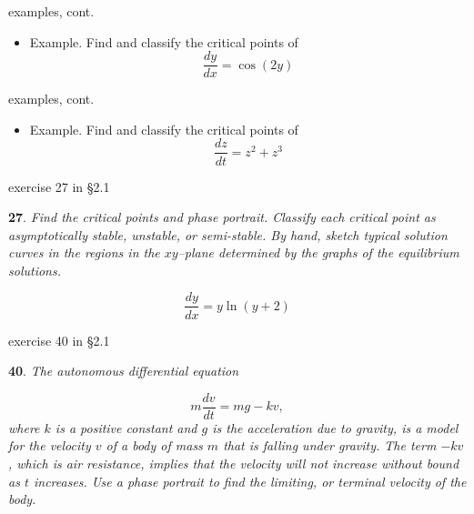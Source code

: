 \documentclass{beamer}
\begin{document}
\begin{frame}{examples, cont.}

\small
\begin{minipage}[t]{0.5\textwidth}
\begin{itemize}
\item Example. Find and classify the critical points of
   $$\frac{dy}{dx} = \cos(2y)$$

\vspace{40mm}
\end{itemize}
\end{minipage}
\end{frame}


\begin{frame}{examples, cont.}

\small
\begin{minipage}[t]{0.5\textwidth}
\begin{itemize}
\item Example. Find and classify the critical points of
   $$\frac{dz}{dt} = z^2 + z^3$$

\vspace{40mm}
\end{itemize}
\end{minipage}
\end{frame}


\begin{frame}{exercise 27 in \S 2.1}

\small
\begin{minipage}[t]{0.45\textwidth}
\noindent \textbf{27}.  \emph{Find the critical points and phase portrait.  Classify each critical point as asymptotically stable, unstable, or semi-stable.  By hand, sketch typical solution curves in the regions in the $xy$--plane determined by the graphs of the equilibrium solutions.}

$$\frac{dy}{dx} = y \ln(y+2)$$
\end{minipage}

\vspace{20mm}
\end{frame}


\begin{frame}{exercise 40 in \S 2.1}

\small
\begin{minipage}[t]{0.5\textwidth}
\noindent \textbf{40}.  \emph{The autonomous differential equation}

\vspace{-2mm}
$$m \frac{dv}{dt} = m g - k v,$$
\emph{where $k$ is a positive constant and $g$ is the acceleration due to gravity, is a model for the velocity $v$ of a body of mass $m$ that is falling under gravity.  The term $-kv$, which is air resistance, implies that the velocity will not increase without bound as $t$ increases.  Use a phase portrait to find the limiting, or \emph{terminal} velocity of the body.}
\end{minipage}

\vspace{10mm}
\end{frame}
\end{document}
